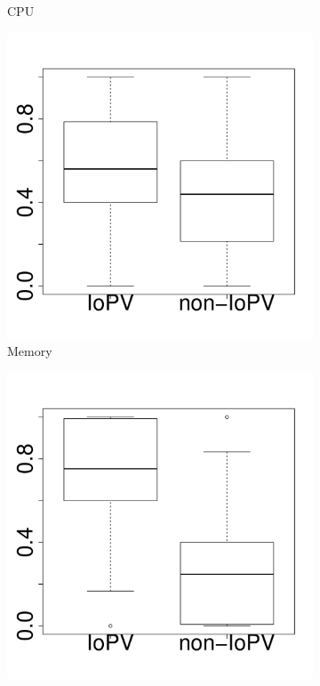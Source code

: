 \documentclass[10pt,journal,compsoc]{IEEEtran}
\begin{document}
\begin{figure}[t]
\begin{subfigure}{0.19\textwidth}
                \caption{CPU}
        \end{subfigure}%
        \begin{subfigure}{0.19\textwidth}
                \includegraphics[width=\linewidth]{Figures/mem-cassandra-boxplot.pdf}
                \caption{Memory}
        \end{subfigure}%
        \begin{subfigure}{0.19\textwidth}
                \includegraphics[width=\linewidth]{Figures/ioread-cassandra-boxplot.pdf}

\end{subfigure}
\end{figure}
\end{document}
